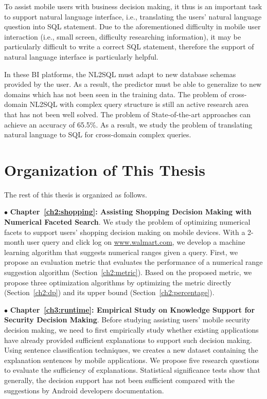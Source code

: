 To assist mobile users with business decision making, it thus is an important task to support natural language interface, i.e., translating the users' natural language question into SQL statement. Due to the aforementioned difficulty in mobile user interaction (i.e., small screen, difficulty researching information), it may be particularly difficult to write a correct SQL statement, therefore the support of natural language interface is particularly helpful. 

In these BI platforms, the NL2SQL must adapt to new database schemas provided by the user. As a result, the predictor must be able to generalize to new domains which has not been seen in the training data. The problem of cross-domain NL2SQL with complex query structure is still an active research area that has not been well solved. The problem of State-of-the-art approaches can achieve an accuracy of 65.5\%. As a result, we study the problem of translating natural language to SQL for cross-domain complex queries. 

\section{Organization of This Thesis}

The rest of this thesis is organized as follows. 

$\bullet$ \textbf{Chapter~\ref{ch2:shopping}: Assisting Shopping Decision Making with Numerical Faceted Search}. We study the problem of optimizing numerical facets to support users' shopping decision making on mobile devices. With a 2-month user query and click log on \url{www.walmart.com}, we develop a machine learning algorithm that suggests numerical ranges given a query. First, we propose an evaluation metric that evaluates the performance of a numerical range suggestion algorithm (Section~\ref{ch2:metric}). Based on the proposed metric, we propose three optimization algorithms by optimizing the metric directly (Section~\ref{ch2:dp}) and its upper bound (Section~\ref{ch2:percentage}). 

$\bullet$ \textbf{Chapter~\ref{ch3:runtime}: Empirical Study on Knowledge Support for Security Decision Making}. Before studying assisting users' mobile security decision making, we need to first empirically study whether existing applications have already provided sufficient explanations to support such decision making. Using sentence classification techniques, we creates a new dataset containing the explanation sentences by mobile applications. We propose five research questions to evaluate the sufficiency of explanations. Statistical significance tests show that generally, the decision support has not been sufficient compared with the suggestions by Android developers documentation. 

